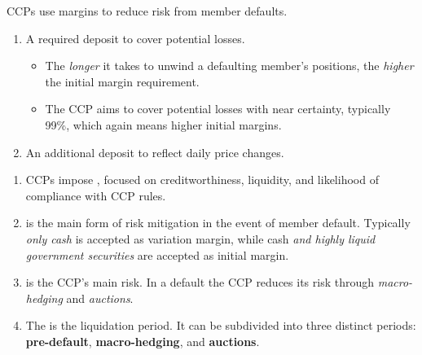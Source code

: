 
CCPs use margins to reduce risk from member defaults.

\begin{enumerate}[label=\alph*)]
\item {} A required deposit to cover potential losses.
  \begin{itemize}
  \item The \emph{longer} it takes to unwind a defaulting member's positions, the
  \emph{higher} the initial margin requirement.
  \item The CCP aims to cover potential losses with near certainty, typically
  99\%, which again means higher initial margins.
  \end{itemize}
\item {} An additional deposit to reflect daily price
changes.
\end{enumerate}


\begin{enumerate}[label=\alph*)]
\item CCPs impose , focused on creditworthiness,
liquidity, and likelihood of compliance with CCP rules.
\item {} is the main form of risk mitigation in the event of member
default. Typically \emph{only cash} is accepted as variation margin, while cash
\emph{and highly liquid government securities} are accepted as initial margin.
\item {} is the CCP's main risk. In a default the CCP reduces
its risk through \emph{macro-hedging} and \emph{auctions}.
\item The  is the liquidation period. It can be
subdivided into three distinct periods: \textbf{pre-default}, \textbf{macro-hedging},
and \textbf{auctions}.
\end{enumerate}


